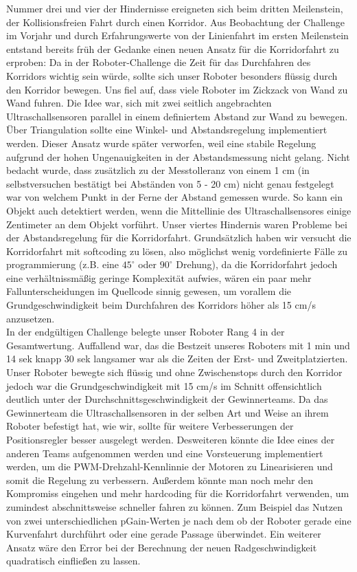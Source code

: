 \documentclass[12pt,a4paper,oneside]{article}
\begin{document}
\begin{spacing}{1.15}
	
	Nummer drei und vier der Hindernisse ereigneten sich beim dritten Meilenstein, der Kollisionsfreien Fahrt durch einen Korridor. Aus Beobachtung der Challenge im  Vorjahr und durch Erfahrungswerte von der Linienfahrt im ersten Meilenstein entstand bereits früh der Gedanke einen neuen Ansatz für die Korridorfahrt zu erproben: Da in der Roboter-Challenge die Zeit für das Durchfahren des Korridors wichtig sein würde, sollte sich unser Roboter besonders flüssig durch den Korridor bewegen. Uns fiel auf, dass viele Roboter im Zickzack von Wand zu Wand fuhren. Die Idee war, sich mit zwei seitlich angebrachten Ultraschallsensoren parallel in einem definiertem Abstand zur Wand zu bewegen. Über Triangulation sollte eine Winkel- und Abstandsregelung implementiert werden. 	Dieser Ansatz wurde später verworfen, weil eine stabile Regelung aufgrund der hohen Ungenauigkeiten in der Abstandsmessung nicht gelang. Nicht bedacht wurde, dass zusätzlich zu der Messtolleranz von einem 1 cm (in selbstversuchen bestätigt bei Abständen von 5 - 20 cm) nicht genau festgelegt war von welchem Punkt in der Ferne der Abstand gemessen wurde. So kann ein Objekt auch detektiert werden, wenn die Mittellinie des Ultraschallsensores einige Zentimeter an dem Objekt vorführt.
	Unser viertes Hindernis waren Probleme bei der Abstandsregelung für die Korridorfahrt. Grundsätzlich haben wir versucht die Korridorfahrt   mit softcoding zu lösen, also möglichst wenig vordefinierte Fälle zu programmierung (z.B. eine $45^\circ$ oder $90^\circ$ Drehung), da die Korridorfahrt jedoch eine verhältnissmäßig geringe Komplexität aufwies, wären ein paar mehr Fallunterscheidungen im Quellcode sinnig gewesen, um vorallem die Grundgeschwindigkeit beim Durchfahren des Korridors höher als 15 cm/s anzusetzen. 	
	\vspace{2mm}\\
	In der endgültigen Challenge belegte unser Roboter Rang 4 in der Gesamtwertung. Auffallend war, das die Bestzeit unseres Roboters mit 1 min und 14 sek knapp 30 sek langsamer war als die Zeiten der Erst- und Zweitplatzierten. Unser Roboter bewegte sich flüssig und ohne Zwischenstops durch den Korridor jedoch war die Grundgeschwindigkeit mit 15 cm/s im Schnitt offensichtlich deutlich unter der Durchschnittsgeschwindigkeit der Gewinnerteams. 
	Da das Gewinnerteam die Ultraschallsensoren in der selben Art und Weise an ihrem Roboter befestigt hat, wie wir, sollte für weitere Verbesserungen der Positionsregler besser ausgelegt werden. Desweiteren könnte die Idee eines der anderen Teams aufgenommen werden und eine Vorsteuerung implementiert werden, um die PWM-Drehzahl-Kennlinnie der Motoren zu Linearisieren und somit die Regelung zu verbessern. Außerdem könnte man noch mehr den Kompromiss eingehen und mehr hardcoding für die Korridorfahrt verwenden, um zumindest abschnittsweise schneller fahren zu können. Zum Beispiel das Nutzen von zwei unterschiedlichen pGain-Werten je nach dem ob der Roboter gerade eine Kurvenfahrt durchführt oder eine gerade Passage überwindet. Ein weiterer Ansatz wäre den Error bei der Berechnung der neuen Radgeschwindigkeit quadratisch einfließen zu lassen.    

\end{spacing}
\end{document}
